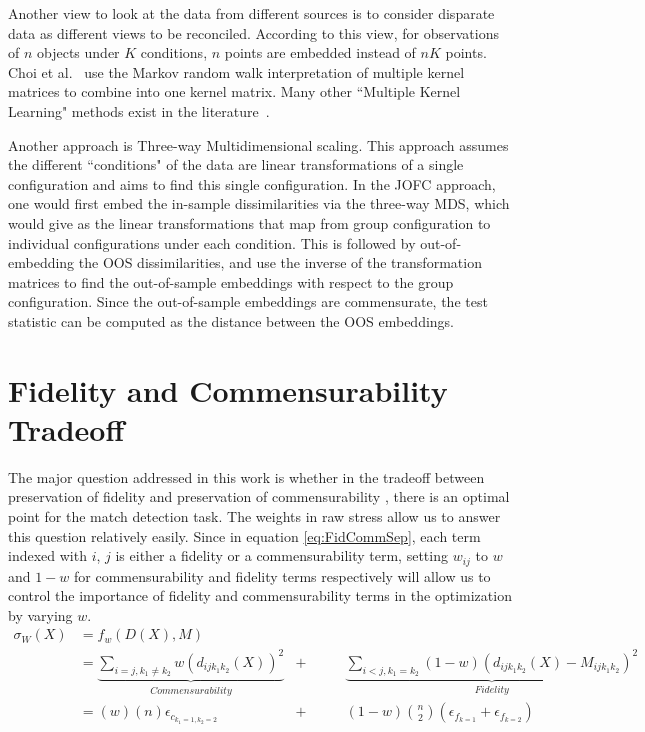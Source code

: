\documentclass[11pt]{article} %
\begin{document}
Another view to look at the data from different sources is to consider disparate data as different views to be reconciled. According to this view, for observations of $n$ objects under $K$ conditions, $n$ points are embedded instead of $nK$ points. Choi et al.\ \cite{Choi:2008:MIM:1619995.1620064} use the Markov random walk interpretation of multiple kernel matrices to combine into one kernel matrix.  Many other ``Multiple Kernel Learning"  methods exist in the literature~\cite{McFee:2011:LMS:1953048.1953063,Lin2009,Lanckriet2004}.

Another approach is Three-way Multidimensional scaling\cite{3wayNMDS,borg+groenen:1997}.
 This approach assumes the  different ``conditions" of the data are linear transformations of a single configuration and aims to find this single configuration. In the JOFC approach, one would first embed the in-sample dissimilarities via the three-way MDS, which would give as the linear transformations that map from group configuration to individual configurations under each condition. This is followed by out-of-embedding the OOS dissimilarities, and use the inverse of the transformation matrices to find the out-of-sample embeddings with respect to the group configuration. Since the out-of-sample embeddings are commensurate, the test statistic can be computed as the distance between the OOS embeddings. 



\section{Fidelity and Commensurability Tradeoff}
The major question  addressed in this work is whether in the tradeoff between preservation of fidelity and preservation of  commensurability , there is an optimal point for the match detection task.  The weights in raw stress allow us to answer this question relatively easily. Since in equation \eqref{eq:FidCommSep},  each term indexed with $i$, $j$ is either a fidelity or a commensurability term, setting $w_{ij}$ to $w$ and $1-w$  for commensurability  and fidelity  terms respectively will allow us to control the importance of fidelity and commensurability terms in the optimization by varying $w$. 
\begin{align*}
\sigma_W(X)&=  f_w(D(X),M) & &\\
&=  \underbrace{\sum_{i=j,k_1\neq k_2}  {w(d_{ij{k_1}{k_2}}(X))^2}}_{Commensurability} & +\hspace{2em} & \underbrace{\sum_{i<j,k_1=k_2}  {(1-w)(d_{ij{k_1}{k_2}}(X)-M_{ijk_1k_2})^2  }  } _{Fidelity}\\
&=  \left(w\right)\left(n\right) \epsilon_{c_{k_1=1,k_2=2}} & +\hspace{2em} & (1-w){{n}\choose{2}} ( \epsilon_{f_{k=1}}+\epsilon_{f_{k=2}} )
\end{align*}
\end{document}
